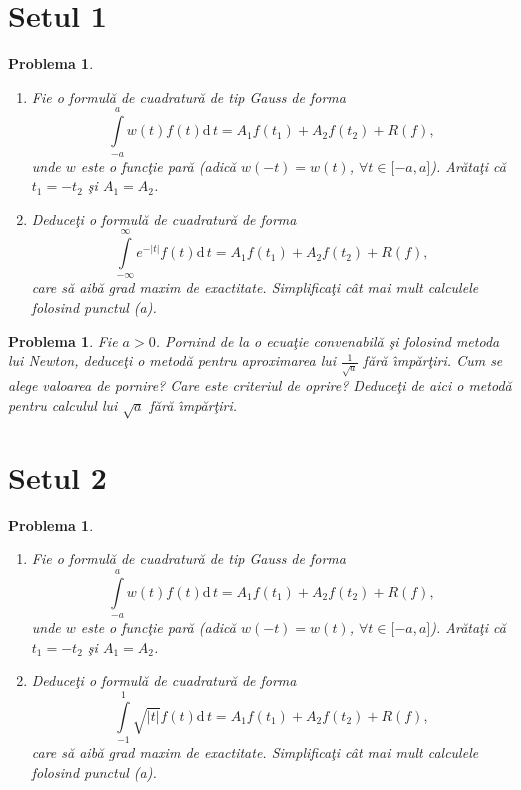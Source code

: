 \documentclass[landscape,twocolumn]{article}%
\newtheorem{problem}[theorem]{Problema}
\begin{document}
\section*{Setul 1}

\begin{problem}
\begin{enumerate}
\item[(a)] Fie o formul\u{a} de cuadratur\u{a} de tip Gauss de forma%
\[
\int\limits_{-a}^{a}w(t)f(t)\mathrm{d}\,t=A_{1}f(t_{1})+A_{2}f(t_{2})+R(f),
\]
unde $w$ este o func\c{t}ie par\u{a} (adic\u{a} $w(-t)=w(t)$, $\forall
t\in\lbrack-a,a]$). Ar\u{a}ta\c{t}i c\u{a} $t_{1}=-t_{2}$ \c{s}i $A_{1}=A_{2}$.

\item[(b)] Deduce\c{t}i o formul\u{a} de cuadratur\u{a} de forma
\[
\int\limits_{-\infty}^{\infty}e^{-|t|}f(t)\mathrm{d}\,t=A_{1}f(t_{1}%
)+A_{2}f(t_{2})+R(f),
\]
care s\u{a} aib\u{a} grad maxim de exactitate. Simplifica\c{t}i c\^{a}t mai
mult calculele folosind punctul (a).
\end{enumerate}
\end{problem}

\begin{problem}
Fie $a>0$. Pornind de la o ecua\c{t}ie convenabil\u{a} \c{s}i folosind metoda
lui Newton, deduce\c{t}i o metod\u{a} pentru aproximarea lui $\frac{1}%
{\sqrt{a}}$ f\u{a}r\u{a} \^{\i}mp\u{a}r\c{t}iri. Cum se alege valoarea de
pornire? Care este criteriul de oprire? Deduce\c{t}i de aici o metod\u{a}
pentru calculul lui $\sqrt{a}$ f\u{a}r\u{a} \^{\i}mp\u{a}r\c{t}iri.
\end{problem}

\vspace{3cm}

\section*{Setul 2}

\begin{problem}
\begin{enumerate}


\item[(a)] Fie o formul\u{a} de cuadratur\u{a} de tip Gauss de forma%
\[
\int\limits_{-a}^{a}w(t)f(t)\mathrm{d}\,t=A_{1}f(t_{1})+A_{2}f(t_{2})+R(f),
\]
unde $w$ este o func\c{t}ie par\u{a} (adic\u{a} $w(-t)=w(t)$, $\forall
t\in\lbrack-a,a]$). Ar\u{a}ta\c{t}i c\u{a} $t_{1}=-t_{2}$ \c{s}i $A_{1}=A_{2}$.

\item[(b)] Deduce\c{t}i o formul\u{a} de cuadratur\u{a} de forma
\[
\int\limits_{-1}^{1}\sqrt{|t|}f(t)\mathrm{d}\,t=A_{1}f(t_{1})+A_{2}%
f(t_{2})+R(f),
\]
care s\u{a} aib\u{a} grad maxim de exactitate. Simplifica\c{t}i c\^{a}t mai
mult calculele folosind punctul (a).
\end{enumerate}
\end{problem}
\end{document}
